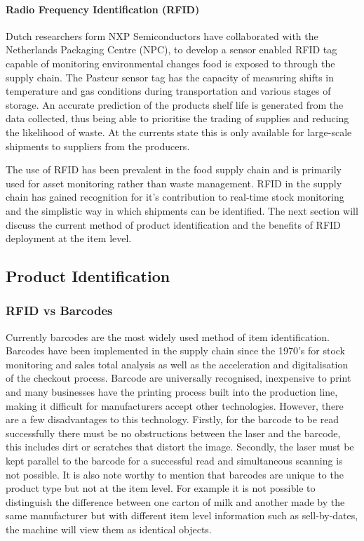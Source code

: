 \documentclass[a4paper, 11pt]{article}
\begin{document}
\paragraph{Radio Frequency Identification (RFID)}
Dutch researchers form NXP Semiconductors have collaborated with the Netherlands Packaging Centre (NPC),  to develop a sensor enabled RFID tag capable of monitoring environmental changes food is exposed to through the supply chain.\cite{rfidFood} The Pasteur sensor tag has the capacity of measuring shifts in temperature and gas conditions during transportation and various stages of storage. An accurate prediction of the products shelf life is generated from the data collected, thus being able to prioritise the trading of supplies and reducing the likelihood of waste. At the currents state this is only available for large-scale shipments to suppliers from the producers.

The use of RFID has been prevalent in the food supply chain and is primarily used for asset monitoring rather than waste management. RFID in the supply chain has gained recognition for it's contribution to real-time stock monitoring and the simplistic way in which shipments can be identified.\cite{RFID} The next section will discuss the current method of product identification and the benefits of RFID deployment at the item level.


\vspace{\baselineskip}
\vspace{\baselineskip}
\vspace{\baselineskip}
\subsection{Product Identification}

\subsubsection{RFID vs Barcodes}Currently barcodes are the most widely used method of item identification. Barcodes have been implemented in the supply chain since the 1970's for stock monitoring and sales total analysis as well as the acceleration and digitalisation of the checkout process. Barcode are universally recognised, inexpensive to print and many businesses have the printing process built into the production line, making it difficult for manufacturers accept other technologies. However, there are a few disadvantages to this technology. Firstly, for the barcode to be read successfully there must be no obstructions between the laser and the barcode, this includes dirt or scratches that distort the image. Secondly, the laser must be kept parallel to the barcode for a successful read and simultaneous scanning is not possible. It is also note worthy to mention that barcodes are unique to the product type but not at the item level. For example it is not possible to distinguish the difference between one carton of milk and another made by the same manufacturer but with different item level information such as sell-by-dates, the machine will view them as identical objects.
\end{document}
